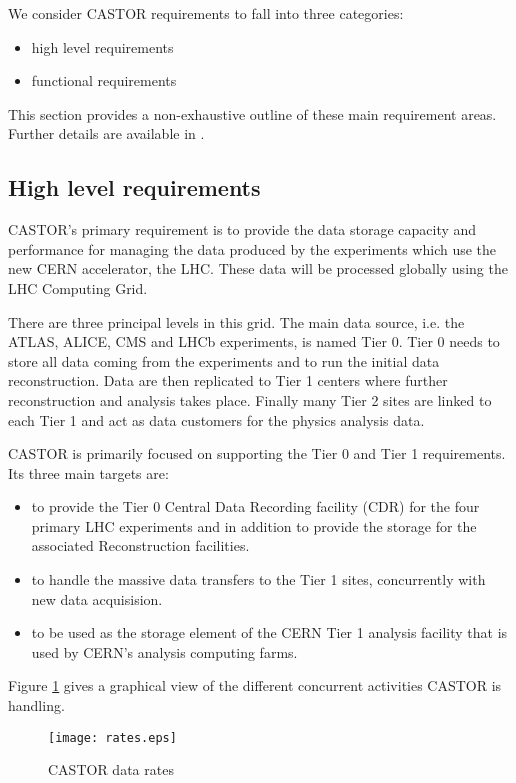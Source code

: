 We consider CASTOR requirements to fall into three categories:
\begin{itemize}
\item high level requirements
\item functional requirements
\end{itemize}
This section provides a non-exhaustive outline of these main
requirement areas. Further details are available in \cite{castor}.

\subsection{High level requirements}

CASTOR's primary requirement is to provide the data storage capacity
and performance for managing the data produced by the
experiments which use the new CERN accelerator, the LHC. These data
will be processed globally using the LHC Computing Grid\cite{LCG}.

There are three principal levels in this grid. The main data source,
i.e. the ATLAS, ALICE, CMS and LHCb experiments, is named Tier 0. Tier
0 needs to store all data coming from the experiments and to run the
initial data reconstruction. Data are then replicated to Tier 1
centers where further reconstruction and analysis takes place. Finally
many Tier 2 sites are linked to each Tier 1 and act as data customers
for the physics analysis data. 

CASTOR is primarily focused on supporting the Tier 0 and Tier 1 requirements.
Its three main targets are:

\begin{itemize}
\item to provide the Tier 0 Central Data Recording facility (CDR) for the four 
primary LHC experiments and in addition to provide the storage for the 
associated Reconstruction facilities.
\item to handle the massive data transfers to the Tier 1 sites, concurrently 
with new data acquisision.
\item to be used as the storage element of the CERN Tier 1 analysis 
facility that is used by CERN's analysis computing farms.
\end{itemize}

Figure \ref{fig:rates} gives a graphical view of the different concurrent activities
CASTOR is handling.

\begin{figure}[htbp]
\centering
\texttt{[image: rates.eps]}
\caption{CASTOR data rates}
\label{fig:rates}
\end{figure}


